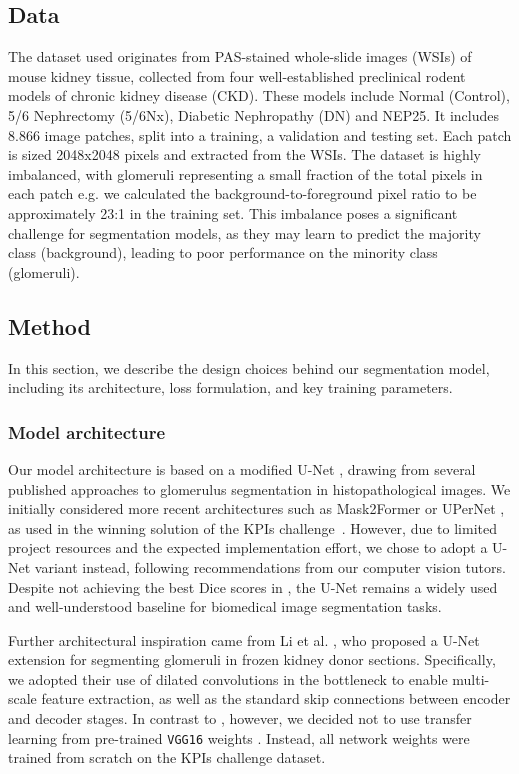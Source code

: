 \documentclass[12pt]{article}
\begin{document}
\subsection{Data} \label{data}
The dataset used originates from PAS-stained whole-slide images (WSIs) of mouse kidney tissue, collected from four well-established preclinical rodent models of chronic kidney disease (CKD). These models include Normal (Control), 5/6 Nephrectomy (5/6Nx), Diabetic Nephropathy (DN) and NEP25. It includes 8.866 image patches, split into a training, a validation and testing set. Each patch is sized 2048x2048 pixels and extracted from the WSIs. The dataset is highly imbalanced, with glomeruli representing a small fraction of the total pixels in each patch e.g. we calculated the background-to-foreground pixel ratio to be approximately 23:1 in the training set. This imbalance poses a significant challenge for segmentation models, as they may learn to predict the majority class (background), leading to poor performance on the minority class (glomeruli).


\subsection{Method}

In this section, we describe the design choices behind our segmentation model, including its architecture, loss formulation, and key training parameters.

\subsubsection{Model architecture}
Our model architecture is based on a modified U-Net \cite{Ronneberger.18.05.2015}, drawing from several published approaches to glomerulus segmentation in histopathological images. We initially considered more recent architectures such as Mask2Former \cite{Cheng.02.12.2021} or UPerNet \cite{Xiao.26.07.2018}, as used in the winning solution \cite{Cap.07.11.2024} of the KPIs challenge~\cite{Deng.11.02.2025}. However, due to limited project resources and the expected implementation effort, we chose to adopt a U-Net variant instead, following recommendations from our computer vision tutors. Despite not achieving the best Dice scores in \cite{Cap.07.11.2024}, the U-Net remains a widely used and well-understood baseline for biomedical image segmentation tasks.

Further architectural inspiration came from Li et al. \cite{Li.2021}, who proposed a U-Net extension for segmenting glomeruli in frozen kidney donor sections. Specifically, we adopted their use of dilated convolutions in the bottleneck to enable multi-scale feature extraction, as well as the standard skip connections between encoder and decoder stages. In contrast to \cite{Li.2021}, however, we decided not to use transfer learning from pre-trained \texttt{VGG16} weights \cite{Simonyan.04.09.2014}. Instead, all network weights were trained from scratch on the KPIs challenge dataset.
\end{document}
